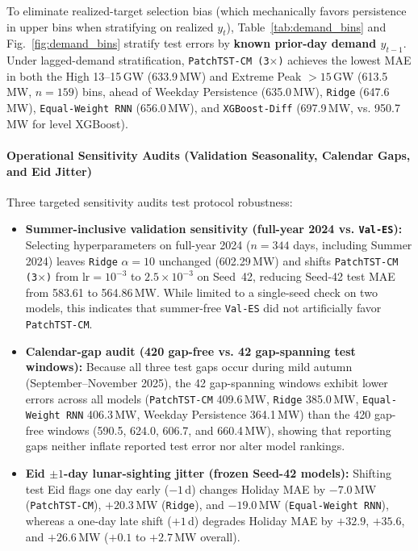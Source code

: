 \documentclass[5p,twocolumn,authoryear]{elsarticle}
\begin{document}
To eliminate realized-target selection bias (which mechanically favors persistence in upper bins when stratifying on realized $y_t$), Table~\ref{tab:demand_bins} and Fig.~\ref{fig:demand_bins} stratify test errors by \textbf{known prior-day demand $y_{t-1}$}. Under lagged-demand stratification, \texttt{PatchTST-CM (3$\times$)} achieves the lowest MAE in both the High 13--15\,GW (633.9\,MW) and Extreme Peak $>15$\,GW (613.5\,MW, $n=159$) bins, ahead of Weekday Persistence (635.0\,MW), \texttt{Ridge} (647.6\,MW), \texttt{Equal-Weight RNN} (656.0\,MW), and \texttt{XGBoost-Diff} (697.9\,MW, vs. 950.7\,MW for level XGBoost).

\paragraph{Operational Sensitivity Audits (Validation Seasonality, Calendar Gaps, and Eid Jitter)}
Three targeted sensitivity audits test protocol robustness:
\begin{itemize}
    \item \textbf{Summer-inclusive validation sensitivity (full-year 2024 vs. \texttt{Val-ES}):} Selecting hyperparameters on full-year 2024 ($n=344$ days, including Summer 2024) leaves \texttt{Ridge} $\alpha = 10$ unchanged (602.29\,MW) and shifts \texttt{PatchTST-CM (3$\times$)} from $\text{lr} = 10^{-3}$ to $2.5\times10^{-3}$ on Seed~42, reducing Seed-42 test MAE from 583.61 to 564.86\,MW. While limited to a single-seed check on two models, this indicates that summer-free \texttt{Val-ES} did not artificially favor \texttt{PatchTST-CM}.
    \item \textbf{Calendar-gap audit (420 gap-free vs. 42 gap-spanning test windows):} Because all three test gaps occur during mild autumn (September--November 2025), the 42 gap-spanning windows exhibit lower errors across all models (\texttt{PatchTST-CM} 409.6\,MW, \texttt{Ridge} 385.0\,MW, \texttt{Equal-Weight RNN} 406.3\,MW, Weekday Persistence 364.1\,MW) than the 420 gap-free windows (590.5, 624.0, 606.7, and 660.4\,MW), showing that reporting gaps neither inflate reported test error nor alter model rankings.
    \item \textbf{Eid $\pm 1$-day lunar-sighting jitter (frozen Seed-42 models):} Shifting test Eid flags one day early ($-1$\,d) changes Holiday MAE by $-7.0$\,MW (\texttt{PatchTST-CM}), $+20.3$\,MW (\texttt{Ridge}), and $-19.0$\,MW (\texttt{Equal-Weight RNN}), whereas a one-day late shift ($+1$\,d) degrades Holiday MAE by $+32.9$, $+35.6$, and $+26.6$\,MW ($+0.1$ to $+2.7$\,MW overall).
\end{itemize}
\end{document}

